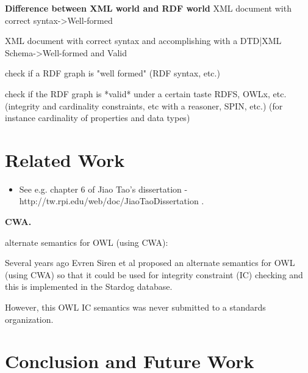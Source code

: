 \documentclass{llncs}
\begin{document}
\textbf{Difference between XML world and RDF world}
XML document with correct syntax->Well-formed

XML document with correct syntax and accomplishing with a DTD|XML Schema->Well-formed and Valid

check if a RDF graph is "well formed" (RDF syntax, etc.)

check if the RDF graph is *valid* under a certain taste RDFS, OWLx, etc. (integrity and cardinality constraints, etc with a reasoner, SPIN, etc.) (for instance cardinality of properties and data types)

\section{Related Work}

\begin{itemize}
	\item See e.g. chapter 6 of Jiao Tao's dissertation - http://tw.rpi.edu/web/doc/JiaoTaoDissertation .
\end{itemize}

\textbf{CWA.}

alternate semantics for OWL (using CWA):

Several years ago Evren Siren et al proposed an alternate semantics for OWL (using CWA) so that it could be used for integrity constraint (IC) checking and this is implemented in the Stardog database. 

However, this OWL IC semantics was never submitted to a standards organization.

\section{Conclusion and Future Work}



{}

\setcounter{tocdepth}{1}
\end{document}
